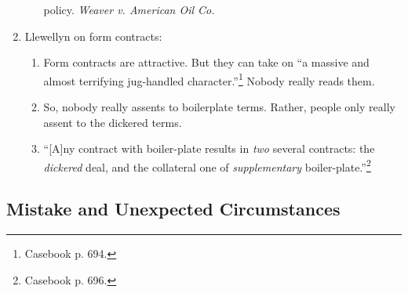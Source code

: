 \begin{enumerate}
\begin{enumerate}
        policy. \emph{Weaver v. American Oil Co.}
    \end{enumerate}
    \item Llewellyn on form contracts: 
    \begin{enumerate}
        \item Form contracts are attractive. But they can take on ``a massive 
        and almost terrifying jug-handled character.''\footnote{Casebook p. 
        694.} Nobody really reads them.
        \item So, nobody really assents to boilerplate terms. Rather, people 
        only really assent to the dickered terms.
        \item ``[A]ny contract with boiler-plate results in \emph{two} several 
        contracts: the \emph{dickered} deal, and the collateral one of 
        \emph{supplementary} boiler-plate.''\footnote{Casebook p. 696.}
    \end{enumerate}
\end{enumerate}

\subsection{Mistake and Unexpected Circumstances}

